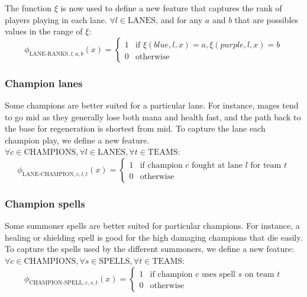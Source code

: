 The function $\xi$ is now used to define a new feature that captures the rank of players playing in each lane.
$\forall l \in \text{LANES}$, and for any $a$ and $b$ that are possibles values in the range of $\xi$:
\begin{equation}\label{eq:laneranks}
\phi_{\text{LANE-RANKS},l,a,b}(x) =
\begin{cases} 
  1 & \text{if } \xi(\textit{blue},l,x) = a, \xi(\textit{purple},l,x) = b\\
  0 & \text{otherwise} 
\end{cases}  
\end{equation}

\subsubsection{Champion lanes}
Some champions are better suited for a particular lane. For instance, mages tend to go mid as they generally lose both mana and health fast, and the path back to the base for regeneration is shortest from mid. To capture the lane each champion play, we define a new feature.
$\forall c \in \text{CHAMPIONS}, \forall l \in \text{LANES}, \forall t \in \text{TEAMS}$:
\begin{equation}\label{eq:championlane}
  \phi_{\text{LANE-CHAMPION},c,l,t}(x) =
\begin{cases}
  1 & \text{if champion } c \text{ fought at lane } l \text{ for team } t\\
  0 & \text{otherwise}
\end{cases}
\end{equation}

\subsubsection{Champion spells}
Some summoner spells are better suited for particular champions. For instance, a healing or shielding spell is good for the high damaging champions that die easily.
To capture the spells used by the different summoners, we define a new feature:
$\forall c \in \text{CHAMPIONS}, \forall s \in \text{SPELLS}, \forall t \in \text{TEAMS}$:
\begin{equation}\label{eq:championspell}
  \phi_{\text{CHAMPION-SPELL},c,s,t}(x) =
\begin{cases} 
  1 & \text{if champion } c \text{ uses spell } s \text{ on team } t\\
  0 & \text{otherwise} 
\end{cases}
\end{equation}

